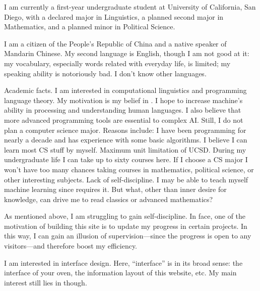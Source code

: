 I am currently a first-year undergraduate student at University of California,
San Diego, with a declared major in Linguistics, a planned second major in
Mathematics, and a planned minor in Political Science.

I am a citizen of the People’s Republic of China and a native speaker of
Mandarin Chinese. My second language is English, though I am not good at it:
my vocabulary, especially words related with everyday life, is limited; my
speaking ability is notoriously bad. I don’t know other languages.

Academic facts. I am interested in computational linguistics and programming
language theory. My motivation is my belief in . I hope to
increase machine’s ability in processing and understanding human languages.
I also believe that more advanced programming tools are essential to complex
AI. Still, I do not plan a computer science major. Reasons include:
\@ulist
  \@item I have been programming for nearly a decade and has
    experience with some basic algorithms. I believe I can learn most CS stuff
    by myself.
  \@item Maximum unit limitation of UCSD. During my undergraduate life I can
    take up to sixty courses here. If I choose a CS major I won’t have too many
    chances taking courses in mathematics, political science, or other
    interesting subjects.
  \@item Lack of self-discipline. I may be able to teach myself machine learning
    since  requires it. But what, other than inner desire for
    knowledge, can drive me to read classics or advanced mathematics?


As mentioned above, I am struggling to gain self-discipline. In face, one of the
motivation of building this site is to update my progress in certain projects.
In this way, I can gain an illusion of supervision—since the progress is open to
any visitors—and therefore boost my efficiency.

I am interested in interface design. Here, “interface” is in its broad sense:
the interface of your oven, the information layout of this website, etc. My main
interest still lies in  though.

